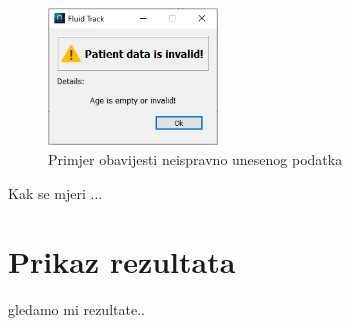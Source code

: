 \documentclass[../diplomski_rad.tex]{subfiles}
\begin{document}
\begin{figure}[htb]
    \centering
    \includegraphics[width=0.4\textwidth]{Figures/invalid_data.png} 
    \caption{Primjer obavijesti neispravno unesenog podatka}
    \label{slk:invalid_data}
\end{figure}

Kak se mjeri ...

\section{Prikaz rezultata}

gledamo mi rezultate..
\end{document}

